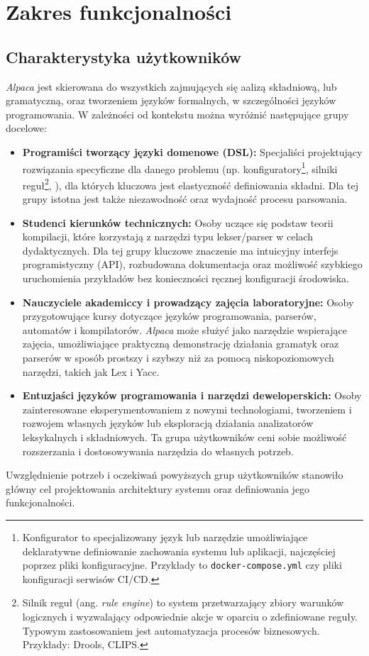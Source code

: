\chapter{Zakres funkcjonalności}
\label{ch:zakres-funkcjonalnosci}

\section{Charakterystyka użytkowników}
\label{sec:charakterystyka-uzytkownikow}

\textit{Alpaca} jest skierowana do wszystkich zajmujących się aalizą składniową, lub gramatyczną, oraz tworzeniem języków formalnych, w szczególności języków programowania.
W zależności od kontekstu można wyróżnić następujące grupy docelowe:

\begin{itemize}
    \item \textbf{Programiści tworzący języki domenowe (DSL):}
    Specjaliści projektujący rozwiązania specyficzne dla danego problemu (np. 
    konfiguratory\footnote{Konfigurator to specjalizowany język lub narzędzie umożliwiające deklaratywne definiowanie zachowania systemu lub aplikacji, najczęściej poprzez pliki konfiguracyjne. Przykłady to \texttt{docker-compose.yml} czy pliki konfiguracji serwisów CI/CD.}, 
    silniki reguł\footnote{Silnik reguł (ang. \textit{rule engine}) to system przetwarzający zbiory warunków logicznych i wyzwalający odpowiednie akcje w oparciu o zdefiniowane reguły. Typowym zastosowaniem jest automatyzacja procesów biznesowych. Przykłady: Drools, CLIPS.}, 
    ), dla których kluczowa jest elastyczność definiowania składni. Dla tej grupy istotna jest także niezawodność oraz wydajność procesu parsowania.

    \item \textbf{Studenci kierunków technicznych:} 
    Osoby uczące się podstaw teorii kompilacji, które korzystają z narzędzi typu lekser/parser w celach dydaktycznych.
    Dla tej grupy kluczowe znaczenie ma intuicyjny interfejs programistyczny (API), rozbudowana dokumentacja oraz możliwość szybkiego uruchomienia przykładów bez konieczności ręcznej konfiguracji środowiska.

    \item \textbf{Nauczyciele akademiccy i prowadzący zajęcia laboratoryjne:}
    Osoby przygotowujące kursy dotyczące języków programowania, parserów, automatów i kompilatorów. 
    \textit{Alpaca} może służyć jako narzędzie wspierające zajęcia, umożliwiające praktyczną demonstrację działania gramatyk oraz parserów w sposób prostszy i szybszy niż za pomocą niskopoziomowych narzędzi, takich jak Lex i Yacc.

    \item \textbf{Entuzjaści języków programowania i narzędzi deweloperskich:}
    Osoby zainteresowane eksperymentowaniem z nowymi technologiami, tworzeniem i rozwojem własnych języków lub eksploracją działania analizatorów leksykalnych i składniowych. 
    Ta grupa użytkowników ceni sobie możliwość rozszerzania i dostosowywania narzędzia do własnych potrzeb.
\end{itemize}

Uwzględnienie potrzeb i oczekiwań powyższych grup użytkowników stanowiło główny cel projektowania architektury systemu oraz definiowania jego funkcjonalności.
